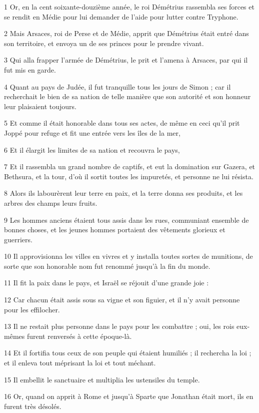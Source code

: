 \par 1 Or, en la cent soixante-douzième année, le roi Démétrius rassembla ses forces et se rendit en Médie pour lui demander de l'aide pour lutter contre Tryphone.
\par 2 Mais Arsaces, roi de Perse et de Médie, apprit que Démétrius était entré dans son territoire, et envoya un de ses princes pour le prendre vivant.
\par 3 Qui alla frapper l'armée de Démétrius, le prit et l'amena à Arsaces, par qui il fut mis en garde.
\par 4 Quant au pays de Judée, il fut tranquille tous les jours de Simon ; car il recherchait le bien de sa nation de telle manière que son autorité et son honneur leur plaisaient toujours.
\par 5 Et comme il était honorable dans tous ses actes, de même en ceci qu'il prit Joppé pour refuge et fit une entrée vers les îles de la mer,
\par 6 Et il élargit les limites de sa nation et recouvra le pays,
\par 7 Et il rassembla un grand nombre de captifs, et eut la domination sur Gazera, et Bethsura, et la tour, d'où il sortit toutes les impuretés, et personne ne lui résista.
\par 8 Alors ils labourèrent leur terre en paix, et la terre donna ses produits, et les arbres des champs leurs fruits.
\par 9 Les hommes anciens étaient tous assis dans les rues, communiant ensemble de bonnes choses, et les jeunes hommes portaient des vêtements glorieux et guerriers.
\par 10 Il approvisionna les villes en vivres et y installa toutes sortes de munitions, de sorte que son honorable nom fut renommé jusqu'à la fin du monde.
\par 11 Il fit la paix dans le pays, et Israël se réjouit d'une grande joie :
\par 12 Car chacun était assis sous sa vigne et son figuier, et il n'y avait personne pour les effilocher.
\par 13 Il ne restait plus personne dans le pays pour les combattre ; oui, les rois eux-mêmes furent renversés à cette époque-là.
\par 14 Et il fortifia tous ceux de son peuple qui étaient humiliés ; il rechercha la loi ; et il enleva tout méprisant la loi et tout méchant.
\par 15 Il embellit le sanctuaire et multiplia les ustensiles du temple.
\par 16 Or, quand on apprit à Rome et jusqu'à Sparte que Jonathan était mort, ils en furent très désolés.
